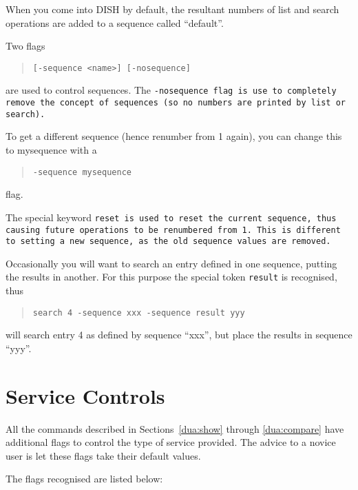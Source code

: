 When you come into DISH
by default, the resultant numbers of list and search operations 
are added to a sequence called ``default''.

Two flags
\begin{quote}\begin{verbatim}
[-sequence <name>] [-nosequence]
\end{verbatim}\end{quote}
are used to control sequences.
The \tt -nosequence\rm \ flag is use to completely remove the 
concept of sequences (so no numbers are printed by list
or search).

To get a different sequence (hence renumber from 1 again), you can change
this to mysequence with a 
\begin{quote}\begin{verbatim}
-sequence mysequence
\end{verbatim}\end{quote}
flag.

The special keyword \tt reset\rm \ is used to reset the current sequence,
thus causing future operations to be renumbered from 1.
This is different to setting a new sequence, as the old sequence values are
removed.

Occasionally you will want to search an entry defined in one sequence,
putting the results in another. For this purpose the special token
\verb+result+ is recognised, thus
\begin{quote}\begin{verbatim}
search 4 -sequence xxx -sequence result yyy
\end{verbatim}\end{quote}
will search entry 4 as defined by sequence ``xxx'', but place the results in
sequence ``yyy''.

\section {Service Controls}
\label{dish_serv}

All the commands described in Sections~\ref{dua:show} 
through \ref{dua:compare} 
have additional flags to control the type of service provided.  The
advice to a novice user is let these flags take their default values. 

The flags recognised are listed below:

